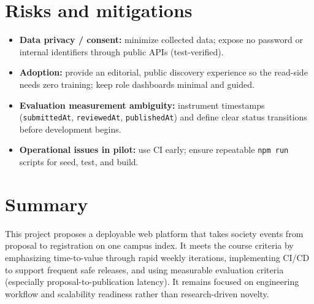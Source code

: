 \documentclass[11pt,a4paper]{article}
\begin{document}
\section{Risks and mitigations}
\begin{itemize}[leftmargin=0.7cm]
    \item \textbf{Data privacy / consent:} minimize
      collected data; expose no password or internal
      identifiers through public APIs (test-verified).
    \item \textbf{Adoption:} provide an editorial, public
      discovery experience so the read-side needs zero
      training; keep role dashboards minimal and guided.
    \item \textbf{Evaluation measurement ambiguity:}
      instrument timestamps (\texttt{submittedAt},
      \texttt{reviewedAt}, \texttt{publishedAt}) and define
      clear status transitions before development begins.
    \item \textbf{Operational issues in pilot:} use CI
      early; ensure repeatable \texttt{npm run} scripts
      for seed, test, and build.
\end{itemize}

\section{Summary}
This project proposes a deployable web platform that
takes society events from proposal to registration on one
campus index.  It meets the course criteria by
emphasizing time-to-value through rapid weekly
iterations, implementing CI/CD to support frequent safe
releases, and using measurable evaluation criteria
(especially proposal-to-publication latency).  It remains
focused on engineering workflow and scalability readiness
rather than research-driven novelty.
\end{document}
